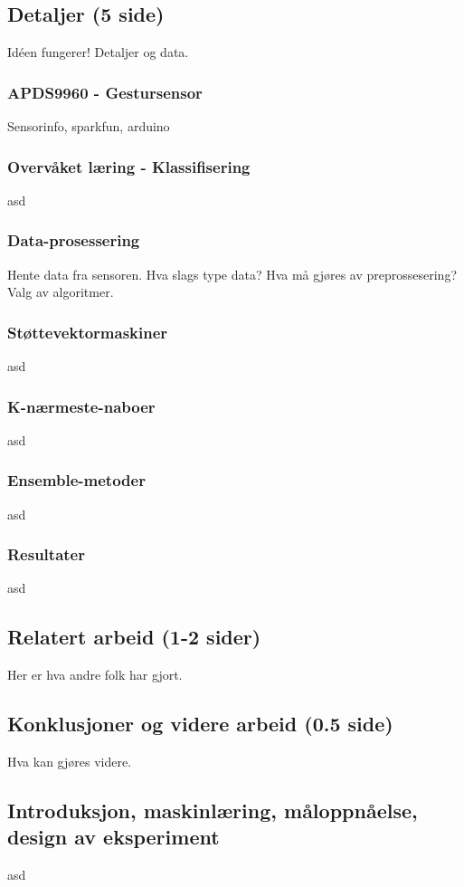 \subsection{Detaljer (5 side)}
Idéen fungerer! Detaljer og data.

\subsubsection{APDS9960 - Gestursensor}
Sensorinfo, sparkfun, arduino

\subsubsection{Overvåket læring - Klassifisering}
asd

\subsubsection{Data-prosessering}
Hente data fra sensoren. Hva slags type data? Hva må gjøres av preprossesering? Valg av algoritmer.

\subsubsection{Støttevektormaskiner}
asd

\subsubsection{K-nærmeste-naboer}
asd

\subsubsection{Ensemble-metoder}
asd

\subsubsection{Resultater}
asd

\subsection{Relatert arbeid (1-2 sider)}
Her er hva andre folk har gjort.

\subsection{Konklusjoner og videre arbeid (0.5 side)}
Hva kan gjøres videre.

\subsection{Introduksjon, maskinlæring, måloppnåelse, design av eksperiment}
asd





